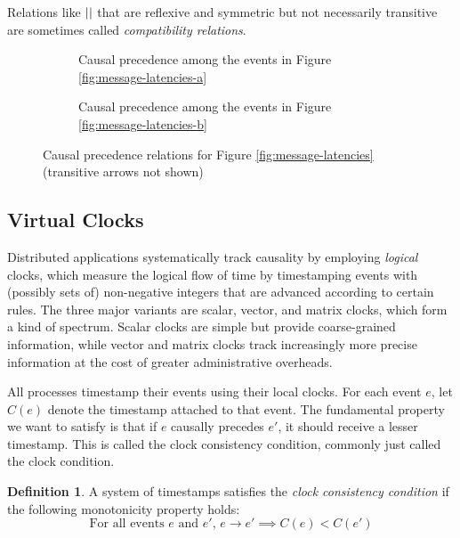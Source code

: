 \documentclass[]             %
{NASA}                       %
\theoremstyle{definition}
\newtheorem{definition}[theorem]{Definition}
\begin{document}
Relations like $||$ that are reflexive and symmetric but not
necessarily transitive are sometimes called \emph{compatibility
  relations}.

\begin{figure}
  \begingroup
  \setlength\belowcaptionskip{4ex}
  \begin{subfigure}{1\textwidth}
    \centering
    
    \caption{Causal precedence among the events in Figure \ref{fig:message-latencies-a}}
    \label{fig:message-co-a}
  \end{subfigure}
  \endgroup
  \begin{subfigure}{1\textwidth}
    \centering
    
    \caption{Causal precedence among the events in Figure \ref{fig:message-latencies-b}}
    \label{fig:message-co-b}
  \end{subfigure}
  \caption{Causal precedence relations for Figure \ref{fig:message-latencies} (transitive arrows not shown)}
  \label{fig:causal-precedence}
\end{figure}

\subsection{Virtual Clocks}
\label{ssec:timestamps}
Distributed applications systematically track causality by employing
\emph{logical} clocks, which measure the logical flow of time by
timestamping events with (possibly sets of) non-negative integers that
are advanced according to certain rules. The three major variants are
scalar, vector, and matrix clocks, which form a kind of
spectrum. Scalar clocks are simple but provide coarse-grained
information, while vector and matrix clocks track increasingly more
precise information at the cost of greater administrative overheads.

All processes timestamp their events using their local clocks. For
each event $e$, let $C(e)$ denote the timestamp attached to that
event. The fundamental property we want to satisfy is that if $e$
causally precedes $e'$, it should receive a lesser timestamp. This is
called the clock consistency condition, commonly just called the clock condition.

\begin{definition}
  A system of timestamps satisfies the \emph{clock consistency
  condition} if the following monotonicity property holds:
  \[ \textrm{For all events $e$ and $e'$, } e \to e' \implies C(e) < C(e') \label{eq:mp}\tag{CC} \]
\end{definition}
\end{document}
